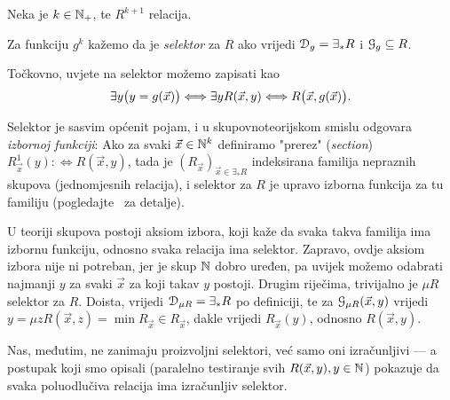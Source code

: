 \begin{definicija}[{name=[selektor]}]
Neka je $k\in{\mathbb N}_+$, te $R^{k+1}$ relacija.

Za funkciju $g^k$ kažemo da je \emph{selektor} za $R$ ako vrijedi $\mathcal D_{g}=\exists_*R$ i $\mathcal G_{g}\subseteq R$.
\end{definicija}

Točkovno, uvjete na selektor možemo zapisati kao
\begin{equation}
    \exists y\bigl(y=g(\vec x)\bigr)\Longleftrightarrow\exists yR(\vec x,y)\Longleftrightarrow R\bigl(\vec x,g(\vec x)\bigr)\text.
\end{equation}

Selektor je sasvim općenit pojam, i u skupovnoteorijskom smislu odgovara \emph{izbornoj funkciji}: Ako za svaki $\vec x\in{\mathbb N}^k$ definiramo "prerez" (\emph{section}) $R_{\vec x}^1(y):\Longleftrightarrow R(\vec x,y)$,
tada je $(R_{\vec x})_{\vec x\in\exists_*R}$ indeksirana familija nepraznih skupova (jednomjesnih relacija), i selektor za $R$ je upravo izborna funkcija za tu familiju (pogledajte~\cite[str.\ 92]{skr:VukTS} za detalje).

U teoriji skupova postoji aksiom izbora, koji kaže da svaka takva familija ima izbornu funkciju, odnosno svaka relacija ima selektor. Zapravo, ovdje aksiom izbora nije ni potreban, jer je skup ${\mathbb N}$ dobro uređen, pa uvijek možemo odabrati najmanji $y$ za svaki $\vec x$ za koji takav $y$ postoji. Drugim riječima, trivijalno je $\mu R$ selektor za $R$. Doista, vrijedi $\mathcal D_{\mu R}=\exists_*R$ po definiciji, te za $\mathcal G_{\mu R}(\vec x,y)$ vrijedi $y=\mu z R(\vec x,z)=\min R_{\vec x}\in R_{\vec x}$, dakle vrijedi $R_{\vec x}(y)$, odnosno $R(\vec x,y)$.

Nas, međutim, ne zanimaju proizvoljni selektori, već samo oni izračunljivi --- a postupak koji smo opisali (paralelno testiranje svih $R(\vec x,y),y\in{\mathbb N}$) pokazuje da svaka poluodlučiva relacija ima izračunljiv selektor.

